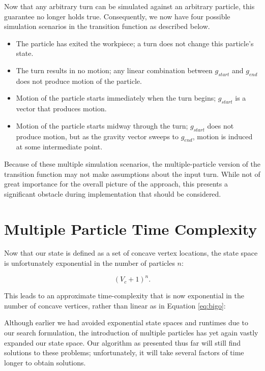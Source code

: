 Now that any arbitrary turn can be simulated against an arbitrary particle, this guarantee no longer holds true. Consequently, we now have four possible simulation scenarios in the transition function as described below.


\begin{itemize}
\item The particle has exited the workpiece; a turn does not change this particle's state.
\item The turn results in no motion; any linear combination between $g_{start}$ and $g_{end}$ does not produce motion of the particle.
\item Motion of the particle starts immediately when the turn begins; $g_{start}$ is a vector that produces motion.
\item Motion of the particle starts midway through the turn; $g_{start}$ does not produce motion, but as the gravity vector sweeps to $g_{end}$, motion is induced at some intermediate point.
\end{itemize}

Because of these multiple simulation scenarios, the multiple-particle version of the transition function may not make assumptions about the input turn. While not of great importance for the overall picture of the approach, this presents a significant obstacle during implementation that should be considered.

\section{Multiple Particle Time Complexity}

Now that our state is defined as a set of concave vertex locations, the state space is unfortunately exponential in the number of particles $n$:

$$
(V_{c} + 1)^n.
$$

This leads to an approximate time-complexity that is now exponential in the number of concave vertices, rather than linear as in Equation \eqref{eq:bigo}:

 {
  \label{eq:bigoTotal}
}

Although earlier we had avoided exponential state spaces and runtimes due to our search formulation, the introduction of multiple particles has yet again vastly expanded our state space. Our algorithm as presented thus far will still find solutions to these problems; unfortunately, it will take several factors of time longer to obtain solutions.

